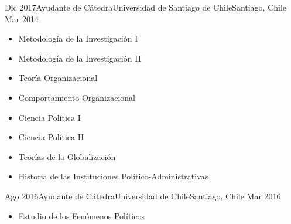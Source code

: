 \begin{experiences}
  \emptySeparator 
  \experience 
    {Dic 2017}{Ayudante de Cátedra}{Universidad de Santiago de Chile}{Santiago, Chile} {Mar 2014}
    {\begin{itemize}
    \item Metodología de la Investigación I
    \item Metodología de la Investigación II
    \item Teoría Organizacional
    \item Comportamiento Organizacional
    \item Ciencia Política I
    \item Ciencia Política II
    \item Teorías de la Globalización
    \item Historia de las Instituciones Político-Administrativas
    \end{itemize}}
    {}
\end{experiences}
\vspace{-2mm}

\begin{experiences}
  \emptySeparator 
  \experience 
    {Ago 2016}{Ayudante de Cátedra}{Universidad de Chile}{Santiago, Chile} {Mar 2016}
    {\begin{itemize}
    \item Estudio de los Fenómenos Políticos
    \end{itemize}}
    {}
\end{experiences}
